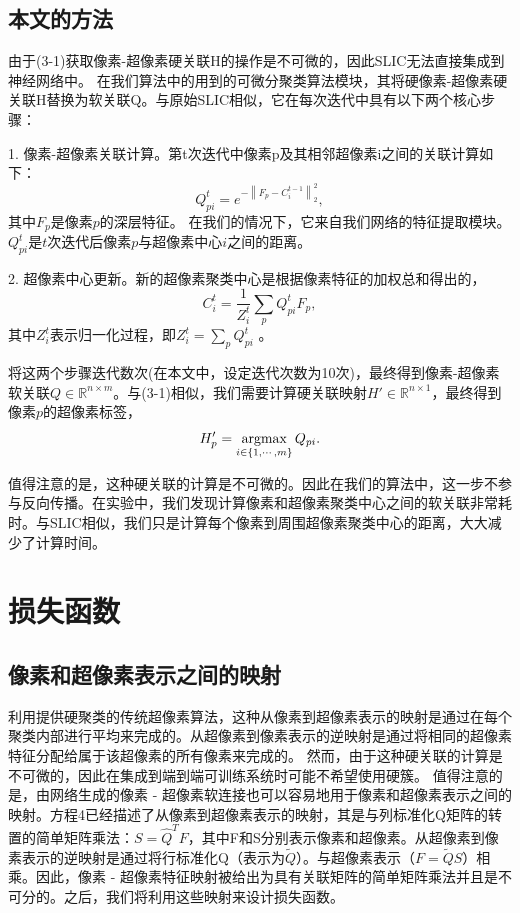 \subsection{本文的方法}

由于(3-1)获取像素-超像素硬关联H的操作是不可微的，因此SLIC无法直接集成到神经网络中。 在我们算法中的用到的可微分聚类算法模块，其将硬像素-超像素硬关联H替换为软关联Q。与原始SLIC相似，它在每次迭代中具有以下两个核心步骤：

1.	像素-超像素关联计算。第t次迭代中像素p及其相邻超像素i之间的关联计算如下：
\begin{equation}
Q_{pi}^{t} = e^{-\left \| F_{p}-C_{i}^{t-1}\right \|_2^2},
\end{equation}
其中\(F_{p}\)是像素$p$的深层特征。 在我们的情况下，它来自我们网络的特征提取模块。\(Q_{pi}^{t}\)是$t$次迭代后像素$p$与超像素中心$i$之间的距离。

2.	超像素中心更新。新的超像素聚类中心是根据像素特征的加权总和得出的，
\begin{equation}
C_{i}^{t} = \frac{1}{Z_{i}^{t}}\sum_{p}Q_{pi}^{t}F_{p},
\end{equation}
其中$Z_{i}^{t}$表示归一化过程，即$Z_{i}^{t} = \sum\nolimits_{p}Q_{pi}^{t} $ 。

将这两个步骤迭代数次(在本文中，设定迭代次数为10次)，最终得到像素-超像素软关联\(Q\in\mathbb{R}^{n\times m}\)。与(3-1)相似，我们需要计算硬关联映射$H'\in \mathbb{R}^{n\times 1}$，最终得到像素$p$的超像素标签，
\begin{equation}
H'_{p} =  \mathop{{{\rm argmax}}}\limits_{{i \in \left\{ 1, \cdots ,m \right\} }}Q_{pi}.
\label{equation.3}
\end{equation}

值得注意的是，这种硬关联的计算是不可微的。因此在我们的算法中，这一步不参与反向传播。在实验中，我们发现计算像素和超像素聚类中心之间的软关联非常耗时。与SLIC相似，我们只是计算每个像素到周围超像素聚类中心的距离，大大减少了计算时间。

\section{损失函数}

\subsection{像素和超像素表示之间的映射}

利用提供硬聚类的传统超像素算法，这种从像素到超像素表示的映射是通过在每个聚类内部进行平均来完成的。从超像素到像素表示的逆映射是通过将相同的超像素特征分配给属于该超像素的所有像素来完成的。
然而，由于这种硬关联的计算是不可微的，因此在集成到端到端可训练系统时可能不希望使用硬簇。
值得注意的是，由网络生成的像素 - 超像素软连接也可以容易地用于像素和超像素表示之间的映射。方程4已经描述了从像素到超像素表示的映射，其是与列标准化Q矩阵的转置的简单矩阵乘法：$S=\hat{Q}^{T}F$，其中F和S分别表示像素和超像素。从超像素到像素表示的逆映射是通过将行标准化Q（表示为$\tilde{Q}$）。与超像素表示（$F = \tilde{Q}S$）相乘。因此，像素 - 超像素特征映射被给出为具有关联矩阵的简单矩阵乘法并且是不可分的。之后，我们将利用这些映射来设计损失函数。

